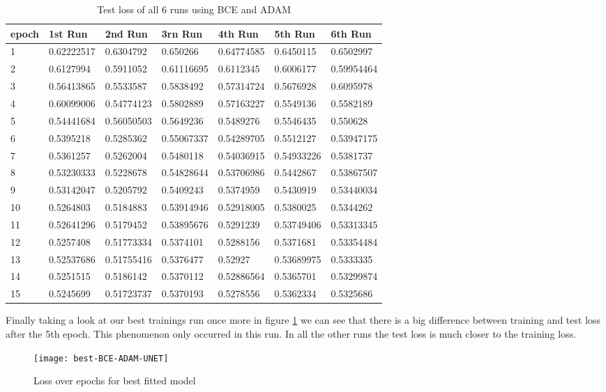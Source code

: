 \begin{table}[!ht]
    \centering
    \begin{tabular}{|l||l||l||l||l||l||l|}
    \hline
    epoch & 1st Run & 2nd Run & 3rn Run & 4th Run & 5th Run & 6th Run \\ \hline
        1 & 0.62222517 & 0.6304792 & 0.650266 & 0.64774585 & 0.6450115 & 0.6502997 \\ \hline
        2 & 0.6127994 & 0.5911052 & 0.61116695 & 0.6112345 & 0.6006177 & 0.59954464 \\ \hline
        3 & 0.56413865 & 0.5533587 & 0.5838492 & 0.57314724 & 0.5676928 & 0.6095978 \\ \hline
        4 & 0.60099006 & 0.54774123 & 0.5802889 & 0.57163227 & 0.5549136 & 0.5582189 \\ \hline
        5 & 0.54441684 & 0.56050503 & 0.5649236 & 0.5489276 & 0.5546435 & 0.550628 \\ \hline
        6 & 0.5395218 & 0.5285362 & 0.55067337 & 0.54289705 & 0.5512127 & 0.53947175 \\ \hline
        7 & 0.5361257 & 0.5262004 & 0.5480118 & 0.54036915 & 0.54933226 & 0.5381737 \\ \hline
        8 & 0.53230333 & 0.5228678 & 0.54828644 & 0.53706986 & 0.5442867 & 0.53867507 \\ \hline
        9 & 0.53142047 & 0.5205792 & 0.5409243 & 0.5374959 & 0.5430919 & 0.53440034 \\ \hline
        10 & 0.5264803 & 0.5184883 & 0.53914946 & 0.52918005 & 0.5380025 & 0.5344262 \\ \hline
        11 & 0.52641296 & 0.5179452 & 0.53895676 & 0.5291239 & 0.53749406 & 0.53313345 \\ \hline
        12 & 0.5257408 & 0.51773334 & 0.5374101 & 0.5288156 & 0.5371681 & 0.53354484 \\ \hline
        13 & 0.52537686 & 0.51755416 & 0.5376477 & 0.52927 & 0.53689975 & 0.5333335 \\ \hline
        14 & 0.5251515 & 0.5186142 & 0.5370112 & 0.52886564 & 0.5365701 & 0.53299874 \\ \hline
        15 & 0.5245699 & 0.51723737 & 0.5370193 & 0.5278556 & 0.5362334 & 0.5325686 \\ \hline
    \end{tabular}
    \caption{\label{tab:bce_adam_test}Test loss of all 6 runs using BCE and ADAM}
\end{table}


Finally taking a look at our best trainings run once more in figure \ref{im:best-BCE-ADAM-UNET} we can see that 
there is a big difference between training and test loss after the 5th epoch. This phenomenon only occurred in this
run. In all the other runs the test loss is much closer to the training loss. 


\begin{figure}[h]
    \texttt{[image: best-BCE-ADAM-UNET]}
    \caption{\label{im:best-BCE-ADAM-UNET} Loss over epochs for best fitted model}
\end{figure}

\newpage
